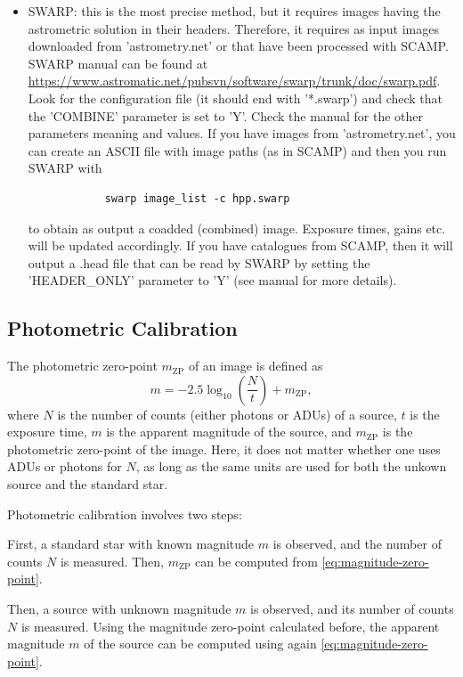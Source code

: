 \documentclass[a4paper, 11pt, fleqn]{memoir}
\begin{document}
\begin{itemize}
    \item
          SWARP: this is the most precise method, but it requires images having the
          astrometric solution in their headers.
          Therefore, it requires as input images downloaded from 'astrometry.net' or that have been processed with SCAMP.
          SWARP manual can be found at \url{https://www.astromatic.net/pubsvn/software/swarp/trunk/doc/swarp.pdf}.
          Look for the configuration file (it should end with '*.swarp') and check that the 'COMBINE' parameter is set to 'Y'.
          Check the manual for the other parameters meaning and values.
          If you have images from 'astrometry.net', you can create an ASCII file with image paths (as in SCAMP) and then you run SWARP with
          \begin{verbatim}
            swarp image_list -c hpp.swarp
          \end{verbatim}
          to obtain as output a coadded (combined) image.
          Exposure times, gains etc. will be updated accordingly.
          If you have catalogues from SCAMP, then it will output a .head file that can be read by SWARP by setting the 'HEADER\_ONLY' parameter to 'Y' (see manual for more details).
\end{itemize}

\subsection{Photometric Calibration}

The photometric zero-point $m_\text{ZP}$ of an image is defined as
\begin{equation}
    \label{eq:magnitude-zero-point}
    m = -2.5 \log_{10} \left( \frac{N}{t} \right) + m_\text{ZP},
\end{equation}
where $N$ is the number of counts (either photons or ADUs) of a source, $t$ is the exposure time, $m$ is the apparent magnitude of the source, and $m_\text{ZP}$ is the photometric zero-point of the image.
Here, it does not matter whether one uses ADUs or photons for $N$, as long as the same units are used for both the unkown source and the standard star.



Photometric calibration involves two steps:

First, a standard star with known magnitude $m$ is observed, and the number of counts $N$ is measured. Then, $m_\text{ZP}$ can be computed from \cref{eq:magnitude-zero-point}.

Then, a source with unknown magnitude $m$ is observed, and its number of counts $N$ is measured. Using the magnitude zero-point calculated before, the apparent magnitude $m$ of the source can be computed using again \cref{eq:magnitude-zero-point}.
\end{document}
